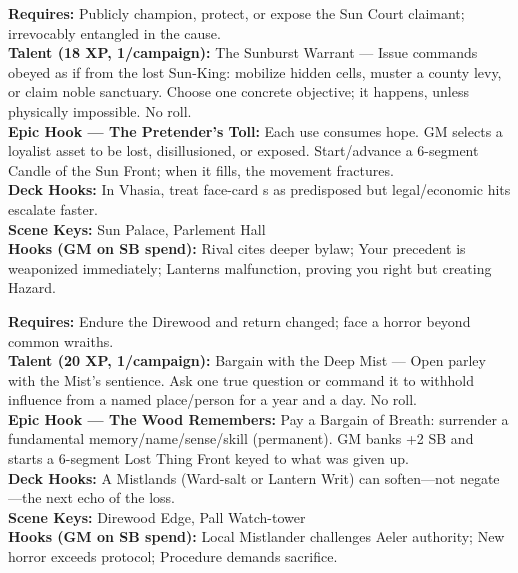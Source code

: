\documentclass[12pt]{article}
\begin{document}
\begin{description}[leftmargin=*]
  \item[\textbf{The Last Dauphin's Shadow}] 
  \textbf{Requires:} Publicly champion, protect, or expose the Sun Court claimant; irrevocably entangled in the cause. \\
  \textbf{Talent (18 XP, 1/campaign):} The Sunburst Warrant — Issue commands obeyed as if from the lost Sun-King: mobilize hidden cells, muster a county levy, or claim noble sanctuary. Choose one concrete objective; it happens, unless physically impossible. No roll. \\
  \textbf{Epic Hook — The Pretender's Toll:} Each use consumes hope. GM selects a loyalist asset to be lost, disillusioned, or exposed. Start/advance a 6-segment Candle of the Sun Front; when it fills, the movement fractures. \\
  \textbf{Deck Hooks:} In Vhasia, treat face-card s as predisposed but legal/economic hits escalate faster. \\
  \textbf{Scene Keys:} Sun Palace, Parlement Hall \\
  \textbf{Hooks (GM on SB spend):} Rival cites deeper bylaw; Your precedent is weaponized immediately; Lanterns malfunction, proving you right but creating Hazard.

  \item[\textbf{Mist-Seer of the Weeping Gate}] 
  \textbf{Requires:} Endure the Direwood and return changed; face a horror beyond common wraiths. \\
  \textbf{Talent (20 XP, 1/campaign):} Bargain with the Deep Mist — Open parley with the Mist's sentience. Ask one true question or command it to withhold influence from a named place/person for a year and a day. No roll. \\
  \textbf{Epic Hook — The Wood Remembers:} Pay a Bargain of Breath: surrender a fundamental memory/name/sense/skill (permanent). GM banks +2 SB and starts a 6-segment Lost Thing Front keyed to what was given up. \\
  \textbf{Deck Hooks:} A Mistlands (Ward-salt or Lantern Writ) can soften—not negate—the next echo of the loss. \\
  \textbf{Scene Keys:} Direwood Edge, Pall Watch-tower \\
  \textbf{Hooks (GM on SB spend):} Local Mistlander challenges Aeler authority; New horror exceeds protocol; Procedure demands sacrifice.


\end{description}
\end{document}
